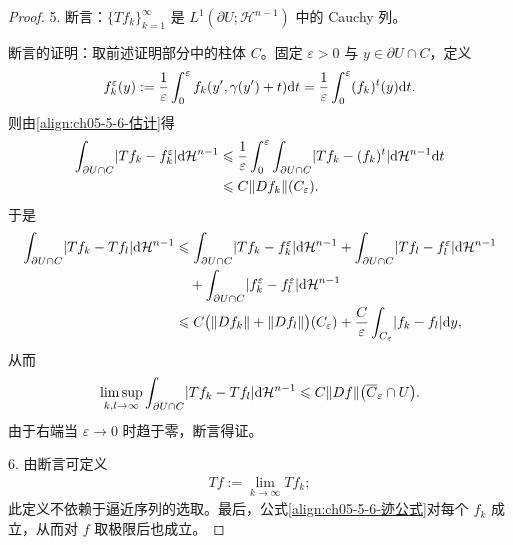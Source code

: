 \documentclass[../../main.tex]{subfiles}%
\begin{document}
\begin{proof}
5. 断言：$\{Tf_k\}_{k=1}^{\infty}$ 是 $L^1(\partial U;\mathcal{H}^{n-1})$ 中的 Cauchy 列。

断言的证明：取前述证明部分中的柱体 $C$。固定 $\varepsilon>0$ 与 $y\in\partial U\cap C$，定义
\begin{align*}
f_k^{\varepsilon}(y):=\frac{1}{\varepsilon}\int_0^{\varepsilon}f_k(y',\gamma(y')+t)\mathrm{d} t=\frac{1}{\varepsilon}\int_0^{\varepsilon}(f_k)^t(y)\mathrm{d} t.
\end{align*}
则由\eqref{align:ch05-5-6-估计}得
\begin{align*}
\int_{\partial U\cap C}\lvert Tf_k-f_k^{\varepsilon}\rvert\mathrm{d}\mathcal{H}^{n-1}&\leqslant\frac{1}{\varepsilon}\int_0^{\varepsilon}\int_{\partial U\cap C}\lvert Tf_k-(f_k)^t\rvert\mathrm{d}\mathcal{H}^{n-1}\mathrm{d} t\\
&\leqslant C\lVert Df_k\rVert(C_{\varepsilon}).
\end{align*}
于是
\begin{align*}
\int_{\partial U\cap C}\lvert Tf_k-Tf_l\rvert\mathrm{d}\mathcal{H}^{n-1}&\leqslant\int_{\partial U\cap C}\lvert Tf_k-f_k^{\varepsilon}\rvert\mathrm{d}\mathcal{H}^{n-1}+\int_{\partial U\cap C}\lvert Tf_l-f_l^{\varepsilon}\rvert\mathrm{d}\mathcal{H}^{n-1}\\
&\quad+\int_{\partial U\cap C}\lvert f_k^{\varepsilon}-f_l^{\varepsilon}\rvert\mathrm{d}\mathcal{H}^{n-1}\\
&\leqslant C\bigl(\lVert Df_k\rVert+\lVert Df_l\rVert\bigr)(C_{\varepsilon})+\frac{C}{\varepsilon}\int_{C_{\varepsilon}}\lvert f_k-f_l\rvert\mathrm{d} y,
\end{align*}
从而
\begin{align*}
\limsup_{k,l\to\infty}\int_{\partial U\cap C}\lvert Tf_k-Tf_l\rvert\mathrm{d}\mathcal{H}^{n-1}\leqslant C\lVert Df\rVert\bigl(\overline{C}_{\varepsilon}\cap U\bigr).
\end{align*}
由于右端当 $\varepsilon\to0$ 时趋于零，断言得证。

6. 由断言可定义
\begin{align*}
Tf:=\lim_{k\to\infty}Tf_k;
\end{align*}
此定义不依赖于逼近序列的选取。最后，公式\eqref{align:ch05-5-6-迹公式}对每个 $f_k$ 成立，从而对 $f$ 取极限后也成立。
\end{proof}
\end{document}
